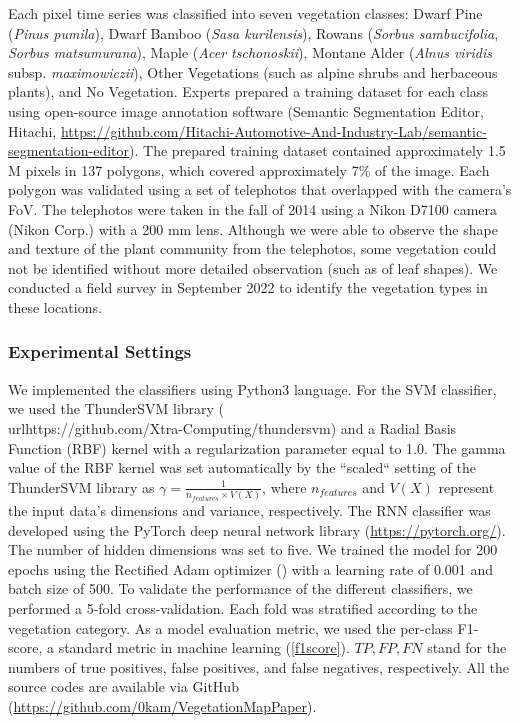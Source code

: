 \documentclass{article}
\begin{document}
Each pixel time series was classified into seven vegetation classes: Dwarf Pine (\emph{Pinus pumila}), Dwarf Bamboo (\emph{Sasa kurilensis}), Rowans (\emph{Sorbus sambucifolia}, \emph{Sorbus matsumurana}), Maple (\emph{Acer tschonoskii}), Montane Alder (\emph{Alnus viridis} subsp. \emph{maximowiczii}), Other Vegetations (such as alpine shrubs and herbaceous plants), and No Vegetation. Experts prepared a training dataset for each class using open-source image annotation software (Semantic Segmentation Editor, Hitachi, \url{https://github.com/Hitachi-Automotive-And-Industry-Lab/semantic-segmentation-editor}). The prepared training dataset contained approximately 1.5 M pixels in 137 polygons, which covered approximately 7\% of the image. Each polygon was validated using a set of telephotos that overlapped with the camera's FoV. The telephotos were taken in the fall of 2014 using a Nikon D7100 camera (Nikon Corp.) with a 200 mm lens. Although we were able to observe the shape and texture of the plant community from the telephotos, some vegetation could not be identified without more detailed observation (such as of leaf shapes). We conducted a field survey in September 2022 to identify the vegetation types in these locations.

\hypertarget{experimental-settings}{%
\subsubsection{Experimental Settings}\label{experimental-settings}}

We implemented the classifiers using Python3 language. For the SVM classifier, we used the ThunderSVM library (\\ url{https://github.com/Xtra-Computing/thundersvm}) and a Radial Basis Function (RBF) kernel with a regularization parameter equal to 1.0. The gamma value of the RBF kernel was set automatically by the ``scaled`` setting of the ThunderSVM library as \(\gamma = \frac{1}{n_{features} \times V(X)}\), where \(n_{features}\) and \(V(X)\) represent the input data's dimensions and variance, respectively. The RNN classifier was developed using the PyTorch deep neural network library (\url{https://pytorch.org/}). The number of hidden dimensions was set to five. We trained the model for 200 epochs using the Rectified Adam optimizer (\cite{Liu2020RAdam}) with a learning rate of 0.001 and batch size of 500. To validate the performance of the different classifiers, we performed a 5-fold cross-validation. Each fold was stratified according to the vegetation category. As a model evaluation metric, we used the per-class F1-score, a standard metric in machine learning (\ref{f1score}). \(TP, FP, FN\) stand for the numbers of true positives, false positives, and false negatives, respectively. All the source codes are available via GitHub (\url{https://github.com/0kam/VegetationMapPaper}).
\end{document}
